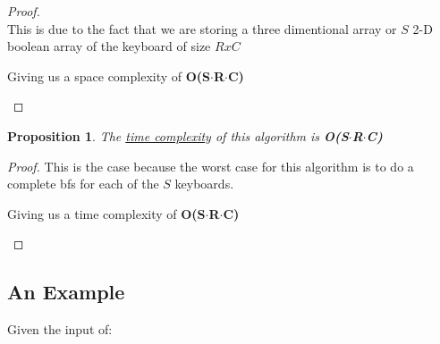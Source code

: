 \documentclass[12pt]{article}
\newtheorem{proposition}[theorem]{Proposition}
\begin{document}
\begin{proof}
~ \\ \indent This is due to the fact that we are storing a three dimentional array or $S$ 2-D boolean array of the
keyboard of size $RxC$
\begin{center}
    Giving us a space complexity of \textbf{O(S$\cdot$R$\cdot$C)}
\end{center}
\end{proof}

\begin{proposition}
\label{numq}
The \underline{time complexity} of this algorithm is \textbf{O(S$\cdot$R$\cdot$C)}
\end{proposition}

\begin{proof}
This is the case because the worst case for this algorithm is to do a complete bfs for each of the $S$ keyboards.

\begin{center}
    Giving us a time complexity of \textbf{O(S$\cdot$R$\cdot$C)}
\end{center}
\end{proof}


\subsection{An Example}
Given the input of:


\end{document}
